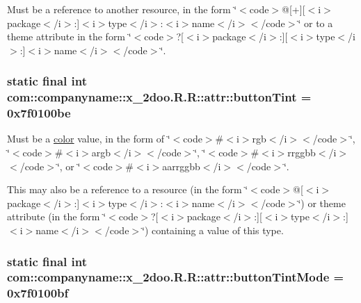 Must be a reference to another resource, in the form \char`\"{}$<$code$>$@\mbox{[}+\mbox{]}\mbox{[}$<$i$>$package$<$/i$>$:\mbox{]}$<$i$>$type$<$/i$>$:$<$i$>$name$<$/i$>$$<$/code$>$\char`\"{} or to a theme attribute in the form \char`\"{}$<$code$>$?\mbox{[}$<$i$>$package$<$/i$>$:\mbox{]}\mbox{[}$<$i$>$type$<$/i$>$:\mbox{]}$<$i$>$name$<$/i$>$$<$/code$>$\char`\"{}. \hypertarget{classcom_1_1companyname_1_1x__2doo_1_1_r_1_1attr_098bf3b103dda75d67334479e76ee41f}{
\subsubsection[{buttonTint}]{\setlength{\rightskip}{0pt plus 5cm}static final int com::companyname::x\_\-2doo.R.R::attr::buttonTint = 0x7f0100be}}
\label{classcom_1_1companyname_1_1x__2doo_1_1_r_1_1attr_098bf3b103dda75d67334479e76ee41f}


Must be a \hyperlink{classcom_1_1companyname_1_1x__2doo_1_1_r_1_1color}{color} value, in the form of \char`\"{}$<$code$>$\#$<$i$>$rgb$<$/i$>$$<$/code$>$\char`\"{}, \char`\"{}$<$code$>$\#$<$i$>$argb$<$/i$>$$<$/code$>$\char`\"{}, \char`\"{}$<$code$>$\#$<$i$>$rrggbb$<$/i$>$$<$/code$>$\char`\"{}, or \char`\"{}$<$code$>$\#$<$i$>$aarrggbb$<$/i$>$$<$/code$>$\char`\"{}. 

This may also be a reference to a resource (in the form \char`\"{}$<$code$>$@\mbox{[}$<$i$>$package$<$/i$>$:\mbox{]}$<$i$>$type$<$/i$>$:$<$i$>$name$<$/i$>$$<$/code$>$\char`\"{}) or theme attribute (in the form \char`\"{}$<$code$>$?\mbox{[}$<$i$>$package$<$/i$>$:\mbox{]}\mbox{[}$<$i$>$type$<$/i$>$:\mbox{]}$<$i$>$name$<$/i$>$$<$/code$>$\char`\"{}) containing a value of this type. \hypertarget{classcom_1_1companyname_1_1x__2doo_1_1_r_1_1attr_c0bd8a274bc2f3aecb8609e37c7e2b04}{
\subsubsection[{buttonTintMode}]{\setlength{\rightskip}{0pt plus 5cm}static final int com::companyname::x\_\-2doo.R.R::attr::buttonTintMode = 0x7f0100bf}}
\label{classcom_1_1companyname_1_1x__2doo_1_1_r_1_1attr_c0bd8a274bc2f3aecb8609e37c7e2b04}


